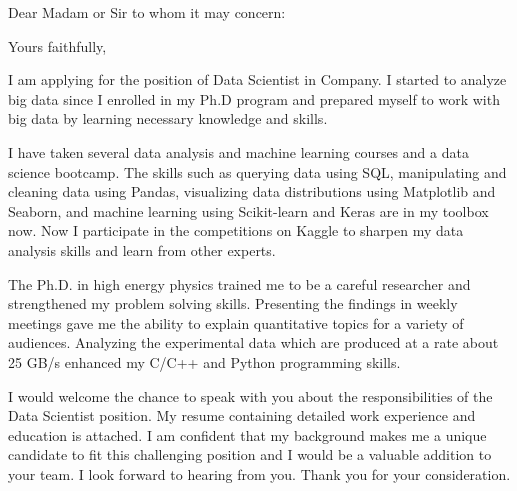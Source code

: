 \documentclass[12pt,letterpaper]{moderncv}   %
\newcommand{\CompanyName}{Company}
\newcommand{\CompanyAddress}{San Francisco, CA}
\newcommand{\JobPositionName}{Data Scientist}
\newcommand{\ManagerName}{Madam or Sir to whom it may concern:}
\newcommand{\ClosingWords}{Yours faithfully,} %
\begin{document}
%
%

\recipient{\CompanyName{}}{\CompanyAddress{}}
\date{\today}
\opening{Dear \ManagerName{}}
\closing{\ClosingWords}
\makelettertitle

%
%
\justifying

I am applying for the position of \JobPositionName{} in \CompanyName{}.
I started to analyze big data since I enrolled in my Ph.D program and prepared myself to work with big data by learning necessary knowledge and skills.

I have taken several data analysis and machine learning courses and a data science bootcamp.
The skills such as querying data using SQL, manipulating and cleaning data using Pandas, visualizing data distributions using Matplotlib and Seaborn, and machine learning using Scikit-learn and Keras are in my toolbox now.
Now I participate in the competitions on Kaggle to sharpen my data analysis skills and learn from other experts.

The Ph.D. in high energy physics trained me to be a careful researcher and strengthened my problem solving skills.
Presenting the findings in weekly meetings gave me the ability to explain quantitative topics for a variety of audiences.
Analyzing the experimental data which are produced at a rate about 25 GB/s enhanced my C/C++ and Python programming skills.

I would welcome the chance to speak with you about the responsibilities of the \JobPositionName{} position.
My resume containing detailed work experience and education is attached.
I am confident that my background makes me a unique candidate to fit this challenging position and I would be a valuable addition to your team.
I look forward to hearing from you.
Thank you for your consideration.

\vspace{0.5cm}

\makeletterclosing
\end{document}
